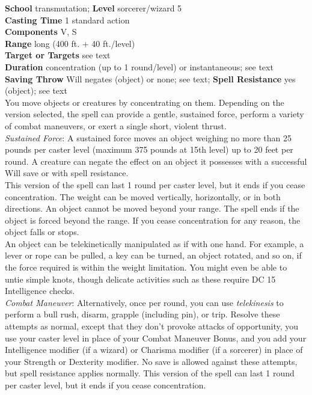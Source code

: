 \textbf{School} transmutation; \textbf{Level} sorcerer/wizard 5\\
\textbf{Casting Time} 1 standard action\\
\textbf{Components} V, S\\
\textbf{Range} long (400 ft. + 40 ft./level)\\
\textbf{Target or Targets} see text\\
\textbf{Duration} concentration (up to 1 round/level) or instantaneous; see text\\
\textbf{Saving Throw }Will negates (object) or none; see text; \textbf{Spell Resistance} yes (object); see text\\
You move objects or creatures by concentrating on them. Depending on the version selected, the spell can provide a gentle, sustained force, perform a variety of combat maneuvers, or exert a single short, violent thrust.\\
\textit{Sustained Force}: A sustained force moves an object weighing no more than 25 pounds per caster level (maximum 375 pounds at 15th level) up to 20 feet per round. A creature can negate the effect on an object it possesses with a successful Will save or with spell resistance.\\
This version of the spell can last 1 round per caster level, but it ends if you cease concentration. The weight can be moved vertically, horizontally, or in both directions. An object cannot be moved beyond your range. The spell ends if the object is forced beyond the range. If you cease concentration for any reason, the object falls or stops.\\
An object can be telekinetically manipulated as if with one hand. For example, a lever or rope can be pulled, a key can be turned, an object rotated, and so on, if the force required is within the weight limitation. You might even be able to untie simple knots, though delicate activities such as these require DC 15 Intelligence checks.\\
\textit{Combat Maneuver}: Alternatively, once per round, you can use \textit{telekinesis }to perform a bull rush, disarm, grapple (including pin), or trip. Resolve these attempts as normal, except that they don't provoke attacks of opportunity, you use your caster level in place of your Combat Maneuver Bonus, and you add your Intelligence modifier (if a wizard) or Charisma modifier (if a sorcerer) in place of your Strength or Dexterity modifier. No save is allowed against these attempts, but spell resistance applies normally. This version of the spell can last 1 round per caster level, but it ends if you cease concentration.\\
